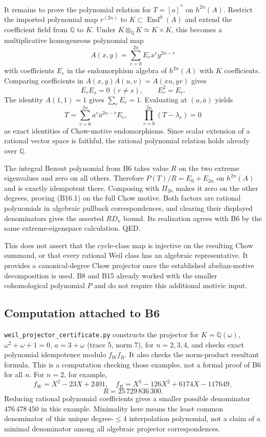 It remains to prove the polynomial relation for \(T=[a]^*\) on \(h^{2n}(A)\). Restrict the imported polynomial map \(r^{(2n)}\) to \(K\subset\operatorname{End}^0(A)\) and extend the coefficient field from \(\mathbb Q\) to \(K\). Under \(K\otimes_{\mathbb Q}K\simeq K\times K\), this becomes a multiplicative homogeneous polynomial map \[
 A(x,y)=\sum_{r=0}^{2n}E_r x^r y^{2n-r}
\] with coefficients \(E_r\) in the endomorphism algebra of \(h^{2n}(A)\) with \(K\) coefficients. Comparing coefficients in \(A(x,y)A(u,v)=A(xu,yv)\) gives \[
 E_rE_s=0\ (r\ne s),\qquad E_r^2=E_r.
\] The identity \(A(1,1)=1\) gives \(\sum_r E_r=1\). Evaluating at \((a,\bar a)\) yields \[
 T=\sum_{r=0}^{2n}a^r\bar a^{2n-r}E_r,
 \qquad \prod_{r=0}^{2n}(T-\lambda_r)=0
\] as exact identities of Chow-motive endomorphisms. Since scalar extension of a rational vector space is faithful, the rational polynomial relation holds already over \(\mathbb Q\).

The integral Bezout polynomial from B6 takes value \(R\) on the two extreme eigenvalues and zero on all others. Therefore \(P(T)/R=E_0+E_{2n}\) on \(h^{2n}(A)\) and is exactly idempotent there. Composing with \(\Pi_{2n}\) makes it zero on the other degrees, proving (B16.1) on the full Chow motive. Both factors are rational polynomials in algebraic pullback correspondences, and clearing their displayed denominators gives the asserted \(R D_n\) bound. Its realization agrees with B6 by the same extreme-eigenspace calculation. QED.

This does not assert that the cycle-class map is injective on the resulting Chow summand, or that every rational Weil class has an algebraic representative. It provides a canonical-degree Chow projector once the established abelian-motive decomposition is used. B8 and B15 already worked with the smaller cohomological polynomial \(P\) and do not require this additional motivic input.

\subsection{Computation attached to B6}\label{computation-attached-to-b6}

\texttt{weil\_projector\_certificate.py} constructs the projector for \(K=\mathbb Q(\omega)\), \(\omega^2+\omega+1=0\), \(a=3+\omega\) (trace 5, norm 7), for \(n=2,3,4\), and checks exact polynomial idempotence modulo \(f_W f_R\). It also checks the norm-product resultant formula. This is a computation checking those examples, not a formal proof of B6 for all \(n\). For \(n=2\), for example, \[
 f_W=X^2-23X+2401,\quad f_R=X^3-126X^2+6174X-117649,
\] \[
 R=25\,729\,836\,300.
\] Reducing rational polynomial coefficients gives a smaller possible denominator \(476\,478\,450\) in this example. Minimality here means the least common denominator of this unique degree-\(\leq4\) interpolation polynomial, not a claim of a minimal denominator among all algebraic projector correspondences.

